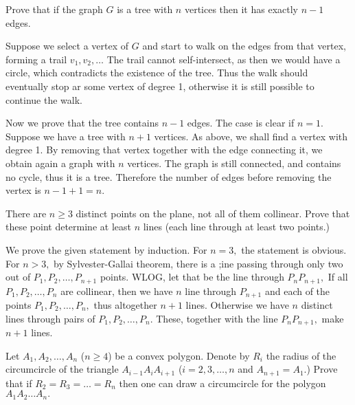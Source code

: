 \documentclass{article}
\begin{document}
\begin{problem}
    Prove that if the graph $G$ is a tree with $n$ vertices then it has exactly $n-1$ edges.
\end{problem}

\begin{soln}
    Suppose we select a vertex of $G$ and start to walk on the edges from that vertex, forming a trail $v_1, v_2, \ldots$
    The trail cannot self-intersect, as then we would have a circle, which contradicts the existence of the tree.
    Thus the walk should eventually stop ar some vertex of degree 1, otherwise it is still possible to continue the walk.

    Now we prove that the tree contains $n-1$ edges. The case is clear if $n=1.$
    Suppose we have a tree with $n+1$ vertices. As above, we shall find a vertex with degree 1.
    By removing that vertex together with the edge connecting it,
    we obtain again a graph with $n$ vertices. The graph is still connected, and contains no cycle, thus it is a tree.
    Therefore the number of edges before removing the vertex is $n-1+1=n$.
\end{soln}

\begin{problem}
    There are $n \ge 3$ distinct points on the plane, not all of them collinear.
    Prove that these point determine at least $n$ lines (each line through at least two points.)
\end{problem}

\begin{soln}
    We prove the given statement by induction. For $n=3,$ the statement is obvious.
    For $n > 3,$ by Sylvester-Gallai theorem, there is a ;ine passing through only two out of $P_1, P_2, \ldots, P_{n+1}$ points.
    WLOG, let that be the line through $P_nP_{n+1},$ If all $P_1, P_2, \ldots, P_{n}$ are collinear,
    then we have $n$ line through $P_{n+1}$ and each of the points $P_1, P_2, \ldots, P_{n},$ thus altogether $n+1$ lines.
    Otherwise we have $n$ distinct lines through pairs of $P_1, P_2, \ldots, P_{n}.$ These, together with the line $P_nP_{n+1},$ make $n+1$ lines.
\end{soln}

\begin{problem}
    Let $A_1, A_2, \ldots, A_n$ ($n \ge 4$) be a convex polygon. Denote by $R_i$ the radius of the circumcircle of the triangle $A_{i-1}A_{i}A_{i+1}$ ($i=2,3,\ldots,n$ and $A_{n+1} = A_1$.)
    Prove that if $R_2 = R_3 = \ldots = R_n$ then one can draw a circumcircle for the polygon $A_1A_2\ldots A_n.$
\end{problem}
\end{document}

